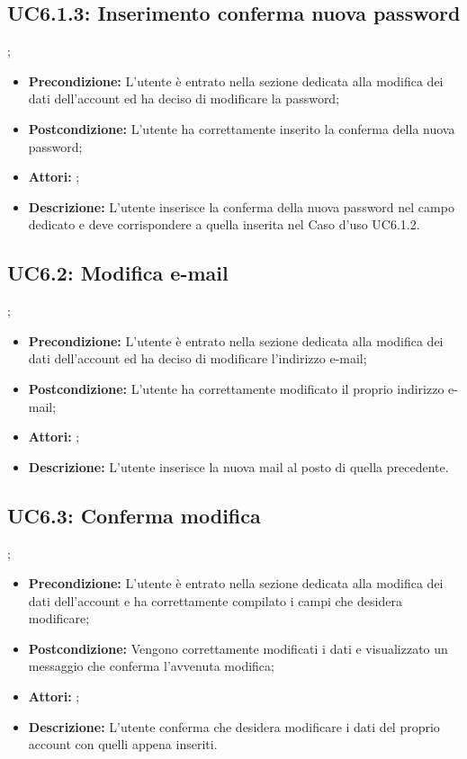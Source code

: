 \subsection{ UC6.1.3: Inserimento conferma nuova password}
;
\begin{itemize}
	\item \textbf{Precondizione:} L’utente è entrato nella sezione dedicata alla modifica dei dati dell’account ed ha deciso di modificare la password;
	\item \textbf{Postcondizione:} L’utente ha correttamente inserito la conferma della nuova password;
	\item \textbf{Attori:} ;
	\item \textbf{Descrizione:} L’utente inserisce la conferma della nuova password nel campo dedicato e deve corrispondere a quella inserita nel Caso d’uso UC6.1.2.
\end{itemize}
\subsection{ UC6.2: Modifica e-mail}
;
\begin{itemize}
	\item \textbf{Precondizione:} L’utente è entrato nella sezione dedicata alla modifica dei dati dell’account ed ha deciso di modificare l’indirizzo e-mail;
	\item \textbf{Postcondizione:} L’utente ha correttamente modificato il proprio indirizzo e-mail;
	\item \textbf{Attori:} ;
	\item \textbf{Descrizione:} L’utente inserisce la nuova mail al posto di quella precedente.
\end{itemize}
\subsection{ UC6.3: Conferma modifica}
;
\begin{itemize}
	\item \textbf{Precondizione:} L’utente è entrato nella sezione dedicata alla modifica dei dati dell’account e ha correttamente compilato i campi che desidera modificare;
	\item \textbf{Postcondizione:} Vengono correttamente modificati i dati e visualizzato un messaggio che conferma l’avvenuta modifica;
	\item \textbf{Attori:} ;
	\item \textbf{Descrizione:} L’utente conferma che desidera modificare i dati del proprio account con quelli appena inseriti.
\end{itemize}
